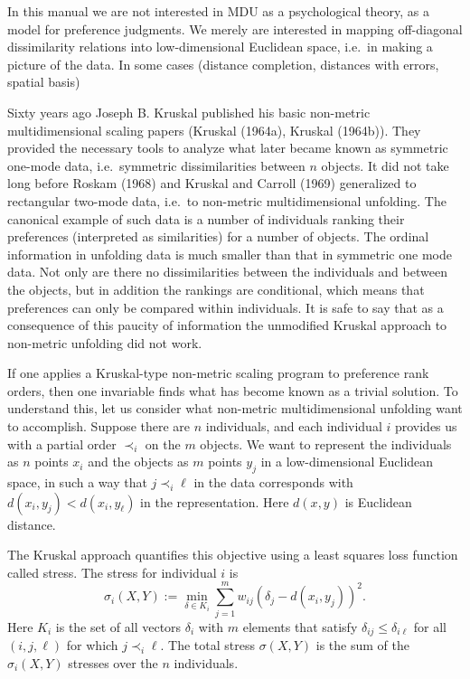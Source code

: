 \documentclass[
  12pt,
]{article}
\begin{document}
In this manual we are not interested in MDU as a psychological theory, as a model for
preference judgments. We merely are interested in mapping off-diagonal dissimilarity
relations into low-dimensional Euclidean space, i.e.~in making a picture of the
data. In some cases (distance completion, distances with errors, spatial basis)

Sixty years ago Joseph B. Kruskal published his basic non-metric multidimensional scaling
papers (Kruskal (1964a), Kruskal (1964b)). They provided the necessary tools to analyze what
later became known as symmetric one-mode data, i.e.~symmetric dissimilarities between
\(n\) objects. It did not take long before Roskam (1968) and Kruskal and Carroll (1969) generalized
to rectangular two-mode data, i.e.~to non-metric multidimensional unfolding. The canonical
example of such data is a number of individuals ranking their preferences (interpreted as similarities) for a number of objects. The ordinal information in unfolding data is much smaller
than that in symmetric one mode data. Not only are there no dissimilarities between the individuals
and between the objects, but in addition the rankings are conditional, which means that
preferences can only be compared within individuals. It is safe to say that as a consequence
of this paucity of information the unmodified Kruskal approach to non-metric unfolding did not work.

If one applies a Kruskal-type non-metric scaling program to preference rank orders, then
one invariable finds what has become known as a trivial solution. To understand this, let
us consider what non-metric multidimensional unfolding want to accomplish. Suppose there
are \(n\) individuals, and each individual \(i\) provides us with a partial order \(\prec_i\)
on the \(m\) objects. We want to represent the individuals as \(n\) points \(x_i\) and the
objects as \(m\) points \(y_j\) in a low-dimensional Euclidean space, in such a way
that \(j\prec_i\ell\) in the data corresponds with \(d(x_i,y_j)<d(x_i,y_\ell)\) in the
representation. Here \(d(x,y)\) is Euclidean distance.

The Kruskal approach quantifies this objective using a least squares
loss function called stress. The stress for individual \(i\) is
\[
\sigma_i(X,Y):=\min_{\delta\in K_i}\sum_{j=1}^m w_{ij}(\delta_j-d(x_i,y_j))^2.
\]
Here \(K_i\) is the set of all vectors \(\delta_i\) with \(m\) elements that satisfy
\(\delta_{ij}\leq\delta_{i\ell}\) for all \((i,j,\ell)\) for which \(j\prec_i\ell\).
The total stress \(\sigma(X,Y)\) is the sum of the \(\sigma_i(X,Y)\) stresses
over the \(n\) individuals.
\end{document}
